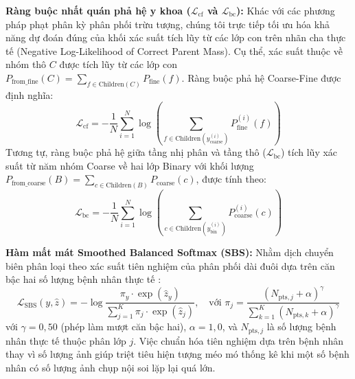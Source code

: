 \documentclass[runningheads]{llncs}
\begin{document}
\noindent \textbf{Ràng buộc nhất quán phả hệ y khoa ($\mathcal{L}_{\text{cf}}$ và $\mathcal{L}_{\text{bc}}$):} Khác với các phương pháp phạt phân kỳ phân phối trừu tượng, chúng tôi trực tiếp tối ưu hóa khả năng dự đoán đúng của khối xác suất tích lũy từ các lớp con trên nhãn cha thực tế (Negative Log-Likelihood of Correct Parent Mass). Cụ thể, xác suất thuộc về nhóm thô $C$ được tích lũy từ các lớp con $P_{\text{from\_fine}}(C) = \sum_{f \in \text{Children}(C)} P_{\text{fine}}(f)$. Ràng buộc phả hệ Coarse-Fine được định nghĩa:
\begin{equation}
\mathcal{L}_{\text{cf}} = -\frac{1}{N} \sum_{i=1}^{N} \log \left( \sum_{f \in \text{Children}(y_{\text{coarse}}^{(i)})} P_{\text{fine}}^{(i)}(f) \right)
\end{equation}
Tương tự, ràng buộc phả hệ giữa tầng nhị phân và tầng thô ($\mathcal{L}_{\text{bc}}$) tích lũy xác suất từ năm nhóm Coarse về hai lớp Binary với khối lượng $P_{\text{from\_coarse}}(B) = \sum_{c \in \text{Children}(B)} P_{\text{coarse}}(c)$, được tính theo:
\begin{equation}
\mathcal{L}_{\text{bc}} = -\frac{1}{N} \sum_{i=1}^{N} \log \left( \sum_{c \in \text{Children}(y_{\text{bin}}^{(i)})} P_{\text{coarse}}^{(i)}(c) \right)
\end{equation}

\noindent \textbf{Hàm mất mát Smoothed Balanced Softmax (SBS):} Nhằm dịch chuyển biên phân loại theo xác suất tiên nghiệm của phân phối dài đuôi dựa trên căn bậc hai số lượng bệnh nhân thực tế \cite{ref_ren2020balanced}:
\begin{equation}
\mathcal{L}_{\text{SBS}}(y, \hat{z}) = -\log \frac{\pi_y \cdot \exp(\hat{z}_y)}{\sum_{j=1}^{K} \pi_j \cdot \exp(\hat{z}_j)}, \quad \text{với } \pi_j = \frac{(N_{\text{pts}, j} + \alpha)^{\gamma}}{\sum_{k=1}^{K} (N_{\text{pts}, k} + \alpha)^{\gamma}}
\end{equation}
với $\gamma = 0{,}50$ (phép làm mượt căn bậc hai), $\alpha = 1{,}0$, và $N_{\text{pts}, j}$ là số lượng bệnh nhân thực tế thuộc phân lớp $j$. Việc chuẩn hóa tiên nghiệm dựa trên bệnh nhân thay vì số lượng ảnh giúp triệt tiêu hiện tượng méo mó thống kê khi một số bệnh nhân có số lượng ảnh chụp nội soi lặp lại quá lớn.
\end{document}
